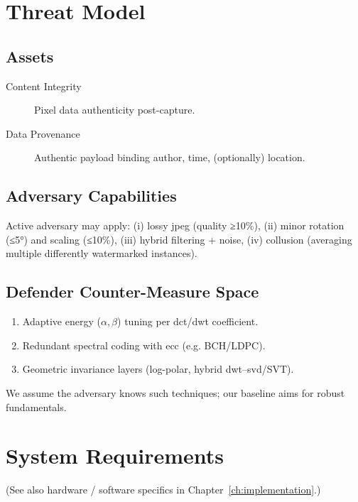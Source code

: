 \section{Threat Model}
\label{sec:deep_dive:threat}

\subsection{Assets}\label{subsec:assets}
\begin{description}
  \item[Content Integrity] Pixel data authenticity post-capture.
  \item[Data Provenance] Authentic payload binding author, time, (optionally) location.
\end{description}

\subsection{Adversary Capabilities}\label{subsec:adversary-capabilities}
Active adversary may apply: (i) lossy \gls{jpeg} (quality ≥10\%), (ii) minor rotation (≤5°) and scaling (≤10\%), (iii) hybrid filtering + noise, (iv) collusion (averaging multiple differently watermarked instances).

\subsection{Defender Counter-Measure Space}\label{subsec:defender-counter-measure-space}
\begin{enumerate}
  \item Adaptive energy ($\alpha,\beta$) tuning per \gls{dct}/\gls{dwt} coefficient.
  \item Redundant spectral coding with \gls{ecc} (e.g. BCH/LDPC).
  \item Geometric invariance layers (log-polar, hybrid \gls{dwt}–\gls{svd}/SVT).
\end{enumerate}
We assume the adversary knows such techniques; our baseline aims for robust fundamentals.

\section{System Requirements}
\label{sec:deep_dive:requirements}
(See also hardware / software specifics in Chapter~\ref{ch:implementation}.)

